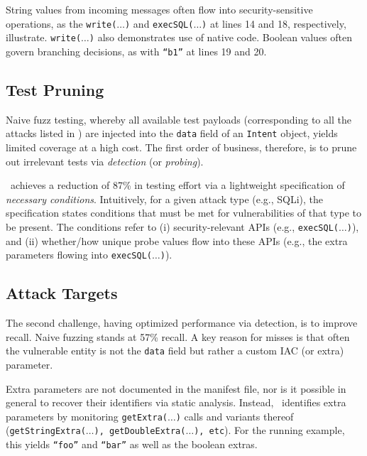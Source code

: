 String values from incoming messages often flow into security-sensitive operations, as the {\tt write($\ldots$)} and {\tt execSQL($\ldots$)} at lines 14 and 18, respectively, illustrate. {\tt write($\ldots$)} also demonstrates use of native code.	Boolean values often govern branching decisions, as with {\tt ``b1''} at lines 19 and 20.

\subsection{Test Pruning}

Naive fuzz testing, whereby all available test payloads (corresponding to all the attacks listed in ) are injected into the {\tt data} field of an {\tt Intent} object, 
yields limited coverage at a high cost. The first order of business, therefore, is to prune out irrelevant tests via \emph{detection} (or \emph{probing}). 

\Tool\ achieves a reduction of 87\% in testing effort via a lightweight specification of \emph{necessary conditions}. Intuitively, for a given attack type (e.g., SQLi), the specification states conditions that must be met for vulnerabilities of that type to be present. The conditions refer to (i) security-relevant APIs (e.g., {\tt execSQL($\ldots$)}), and (ii) whether/how unique probe values flow into these APIs (e.g., the extra parameters flowing into {\tt execSQL($\ldots$)}).

\subsection{Attack Targets}

The second challenge, having optimized performance via detection, is to improve recall. Naive fuzzing stands at 57\% recall. A key reason for misses is that often the vulnerable entity is not the 
{\tt data} field but rather a custom IAC (or extra) parameter.

Extra parameters are not documented in the manifest file, nor is it possible in general to recover their identifiers via static analysis. Instead, \Tool\ identifies extra parameters by monitoring {\tt getExtra($\ldots$)} calls and variants thereof ({\tt getStringExtra($\ldots$), getDoubleExtra($\ldots$), etc}). For the running example, this yields {\tt ``foo''} and {\tt ``bar''} as well as the boolean extras.
%

